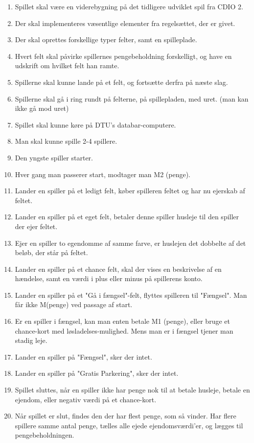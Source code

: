 \begin{enumerate}
\item Spillet skal være en viderebygning på det tidligere udviklet spil fra CDIO 2.
\item Der skal implementeres væsentlige elementer fra regelsættet, der er givet.
\item Der skal oprettes forskellige typer felter, samt en spilleplade.
\item Hvert felt skal påvirke spillernes pengebeholdning forskelligt, og have en udskrift om hvilket felt han ramte.
\item Spillerne skal kunne lande på et felt, og fortsætte derfra på næste slag.

\item Spillerne skal gå i ring rundt på felterne, på spillepladen, med uret. (man kan ikke gå mod uret)
\item Spillet skal kunne køre på DTU's databar-computere.
\item Man skal kunne spille 2-4 spillere.
\item Den yngste spiller starter.
\item Hver gang man passerer start, modtager man M2 (penge).

\item Lander en spiller på et ledigt felt, køber spilleren feltet og har nu ejerskab af feltet.
\item Lander en spiller på et eget felt, betaler denne spiller husleje til den spiller der ejer feltet.
\item Ejer en spiller to egendomme af samme farve, er huslejen det dobbelte af det beløb, der står på feltet.
\item Lander en spiller på et chance felt, skal der vises en beskrivelse af en hændelse, samt en værdi i plus eller minus på spillerens konto.
\item Lander en spiller på et "Gå i fængsel"-felt, flyttes spilleren til "Fængsel". Man får ikke M(penge) ved passage af start.

\item Er en spiller i fængsel, kan man enten betale M1 (penge), eller bruge et chance-kort med løsladelses-mulighed. Mens man er i fængsel tjener man stadig leje.
\item Lander en spiller på "Fængsel", sker der intet.
\item Lander en spiller på "Gratis Parkering", sker der intet.
\item Spillet sluttes, når en spiller ikke har penge nok til at betale husleje, betale en ejendom, eller negativ værdi på et chance-kort.
\item Når spillet er slut, findes den der har flest penge, som så vinder. Har flere spillere samme antal penge, tælles alle ejede ejendomsværdi'er, og lægges til pengebeholdningen.


\end{enumerate}
